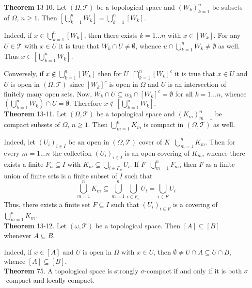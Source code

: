 \documentclass[a4paper]{article}
\newcommand{\clo}[1]{\left [ #1 \right ]}
\newcommand{\brac}[1]{\left ( #1 \right )}
\newcommand{\Tcal}{\mathcal{T}}
\newcommand{\defn}{\mathop{\overset{\Delta}{=}}\nolimits}
\begin{document}
\label{thm:finite_union_closed}\noindent\textbf{Theorem} 13-10.
Let $\brac{\Omega,\Tcal}$ be a topological space and $\brac{W_k}_{k=1}^n$ be subsets of $\Omega$, $n\geq1$. Then $\clo{\bigcup_{k=1}^n W_k} = \bigcup_{k=1}^n \clo{W_k}$.

Indeed, if $x\in \bigcup_{k=1}^n \clo{W_k}$, then there exists $k=1\ldots n$ with $x\in \clo{W_k}$. For any $U\in \Tcal$ with $x\in U$ it is true that $W_k\cap U\neq \emptyset$, whence $u\cap \bigcup_{k=1}^n W_k \neq \emptyset$ as well. Thus $x\in \clo{\bigcup_{k=1}^n W_k}$.

Conversely, if $x\notin \bigcup_{k=1}^n \clo{W_k}$ then for $U\defn \bigcap_{k=1}^n \clo{W_k}^c$ it is true that $x\in U$ and $U$ is open in $\brac{\Omega,\Tcal}$ since $\clo{W_k}^c$ is open in $\Omega$ and $U$ is an intersection of finitely many open sets. Now, $W_k\cap U\subseteq w_k\cap \clo{W_k}^c = \emptyset$ for all $k=1\ldots n$, whence $\brac{\bigcup_{k=1}^n W_k}\cap U = \emptyset$. Therefore $x\notin \clo{\bigcup_{k=1}^n W_k}$.\\

\label{thm:finite_union_cmpact}\noindent\textbf{Theorem} 13-11.
Let $\brac{\Omega,\Tcal}$ be a topological space and $\brac{K_m}_{m=1}^n$ be compact subsets of $\Omega$, $n\geq1$. Then $\bigcup_{m=1}^n K_m$ is compact in $\brac{\Omega,\Tcal}$ as well.

Indeed, let $\brac{U_i}_{i\in I}$ be an open in $\brac{\Omega,\Tcal}$ cover of $K\defn \bigcup_{m=1}^n K_m$. Then for every $m=1\ldots n$ the collection $\brac{U_i}_{i\in I}$ is an open covering of $K_m$, whence there exists a finite $F_n\subseteq I$ with $K_m\subseteq \bigcup_{i\in F_n} U_i$. If $F\defn \bigcup_{m=1}^n F_m$, then $F$ as a finite union of finite sets is a finite subset of $I$ such that \[\bigcup_{m=1}^n K_m \subseteq \bigcup_{m=1}^n \bigcup_{i\in F_n} U_i = \bigcup_{i\in F} U_i\] Thus, there exists a finite set $F\subseteq I$ such that $\brac{U_i}_{i\in F}$ is a covering of $\bigcup_{m=1}^n K_m$.\\

\label{thm:nested_closure}\noindent \textbf{Theorem} 13-12.
Let $\brac{\omega, \Tcal}$ be a topological space. Then $\clo{A}\subseteq \clo{B}$ whenever $A\subseteq B$.

Indeed, if $x\in \clo{A}$ and $U$ is open in $\Omega$ with $x\in U$, then $\emptyset\neq U\cap A\subseteq U\cap B$, whence $\clo{A}\subseteq \clo{B}$.\\

\label{thm:strong_compactness} \noindent \textbf{Theorem} 75.
A topological space is strongly $\sigma$-compact if and only if it is both $\sigma$-compact and locally compact.
\end{document}
